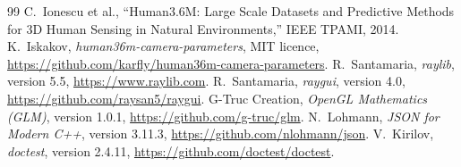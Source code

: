 \documentclass[11pt]{article}
\begin{document}
\begin{thebibliography}{99}
 C.\ Ionescu et al., ``Human3.6M: Large Scale Datasets and
  Predictive Methods for 3D Human Sensing in Natural Environments,''
  IEEE TPAMI, 2014.
 K.\ Iskakov, \emph{human36m-camera-parameters}, MIT licence,
  \url{https://github.com/karfly/human36m-camera-parameters}.
 R.\ Santamaria, \emph{raylib}, version 5.5,
  \url{https://www.raylib.com}.
 R.\ Santamaria, \emph{raygui}, version 4.0,
  \url{https://github.com/raysan5/raygui}.
 G-Truc Creation, \emph{OpenGL Mathematics (GLM)}, version 1.0.1,
  \url{https://github.com/g-truc/glm}.
 N.\ Lohmann, \emph{JSON for Modern C++}, version 3.11.3,
  \url{https://github.com/nlohmann/json}.
 V.\ Kirilov, \emph{doctest}, version 2.4.11,
  \url{https://github.com/doctest/doctest}.
\end{thebibliography}
\end{document}
